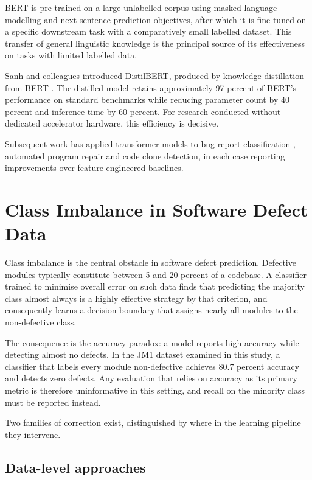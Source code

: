 \documentclass[12pt,a4paper,oneside]{report}
\begin{document}
BERT is pre-trained on a large unlabelled corpus using masked language modelling and next-sentence prediction objectives, after which it is fine-tuned on a specific downstream task with a comparatively small labelled dataset. This transfer of general linguistic knowledge is the principal source of its effectiveness on tasks with limited labelled data.

Sanh and colleagues introduced DistilBERT, produced by knowledge distillation from BERT \cite{sanh2019}. The distilled model retains approximately 97 percent of BERT's performance on standard benchmarks while reducing parameter count by 40 percent and inference time by 60 percent. For research conducted without dedicated accelerator hardware, this efficiency is decisive.

Subsequent work has applied transformer models to bug report classification \cite{chen2022}, automated program repair and code clone detection, in each case reporting improvements over feature-engineered baselines.

\section{Class Imbalance in Software Defect Data}

Class imbalance is the central obstacle in software defect prediction. Defective modules typically constitute between 5 and 20 percent of a codebase. A classifier trained to minimise overall error on such data finds that predicting the majority class almost always is a highly effective strategy by that criterion, and consequently learns a decision boundary that assigns nearly all modules to the non-defective class.

The consequence is the accuracy paradox: a model reports high accuracy while detecting almost no defects. In the JM1 dataset examined in this study, a classifier that labels every module non-defective achieves 80.7 percent accuracy and detects zero defects. Any evaluation that relies on accuracy as its primary metric is therefore uninformative in this setting, and recall on the minority class must be reported instead.

Two families of correction exist, distinguished by where in the learning pipeline they intervene.

\subsection{Data-level approaches}
\end{document}
